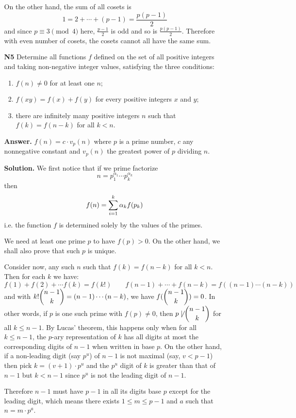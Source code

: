 \documentclass[11pt,a4paper]{article}
\begin{document}
\begin{enumerate}
\begin{enumerate}
		On the other hand, the sum of all cosets is 
		\[
		1=2+\cdots + (p-1)=\frac{p(p-1)}{2}
		\]
		and since $p\equiv 3\pmod{4}$ here, $\frac{p-1}{2}$ is odd and so is $\frac{p(p-1)}{2}$. Therefore with even number of cosets, the cosets cannot all have the same sum. 
		
		\item [\textbf{N5}] Determine all functions $f$ defined on the set of all positive integers and taking non-negative integer values, satisfying the three conditions:
		\begin{enumerate}
			\item $f(n)\neq 0$ for at least one $n$;
			\item $f(xy)=f(x)+f(y)$ for every positive integers $x$ and $y$;
			\item there are infinitely many positive integers $n$ such that $f(k)=f(n-k)$ for all $k<n$. 
		\end{enumerate}
		
		\textbf{Answer.} $f(n)=c\cdot v_p(n)$ where $p$ is a prime number, $c$ any nonnegative constant and $v_p(n)$ the greatest power of $p$ dividing $n$. 
		
		\textbf{Solution.} We first notice that if we prime factorize 
		\[
		n=p_1^{\alpha_1}\cdots p_k^{\alpha_k}
		\]
		then 
		\[
		f(n)=\displaystyle\sum_{i=1}^k \alpha_k f(p_k)
		\]
		i.e. the function $f$ is determined solely by the values of the primes. 
		
		We need at least one prime $p$ to have $f(p)>0$. On the other hand, we shall also prove that such $p$ is unique. 
		
		Consider now, any such $n$ such that $f(k)=f(n-k)$ for all $k<n$. Then for each $k$ we have: 
		\[
		f(1)+f(2)+\cdots f(k) = f(k!)\qquad f(n-1)+\cdots + f(n-k) = f((n-1)\cdots (n-k))
		\]
		and with $k! \dbinom{n-1}{k} = (n-1)\cdots (n-k)$, we have $f(\dbinom{n-1}{k})=0$. 
		In other words, if $p$ is one such prime with $f(p)\neq 0$, then $p\not\mid \dbinom{n-1}{k}$ for all $k\le n-1$. 
		By Lucas' theorem, this happens only when for all $k\le n-1$, the $p$-ary representation of $k$ has all digits at most the corresponding digits of $n-1$ when written in base $p$. 
		On the other hand, if a non-leading digit (say $p^u$) of $n-1$ is not maximal (say, $v < p-1$) then pick $k=(v+1)\cdot p^u$ and the $p^u$ digit of $k$ is greater than that of $n-1$ but $k<n-1$ since $p^u$ is not the leading digit of $n-1$. 
		
		Therefore $n-1$ must have $p-1$ in all its digits base $p$ except for the leading digit, which means there exists $1\le m\le p-1$ and $a$ such that $n=m\cdot p^a$. 
		

\end{enumerate}
\end{enumerate}
\end{document}
